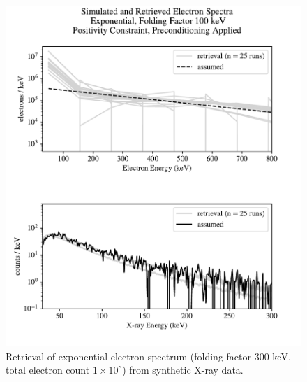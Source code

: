 \begin{figure}[p]
    \centering
    \includegraphics[width=\textwidth]{figures/chapter_4/synthetic_data_examples/exponential_folding_300keV_posonly_preconditioning_1e8_particles}
    \caption{Retrieval of exponential electron spectrum (folding factor 300 keV, total electron count $1\times10^8$) from synthetic X-ray data.}
    \label{why_non_negative_is_good}
\end{figure}

